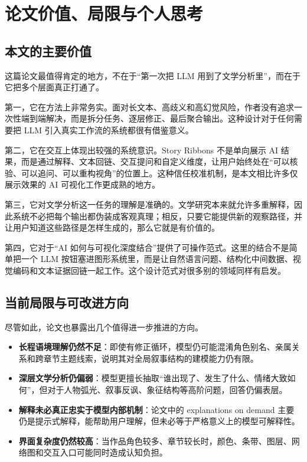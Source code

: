 \documentclass[a4paper,12pt,UTF8]{article}
\begin{document}
\section{论文价值、局限与个人思考}

\subsection{本文的主要价值}
这篇论文最值得肯定的地方，不在于“第一次把 LLM 用到了文学分析里”，而在于它把多个层面真正打通了。

第一，它在方法上非常务实。面对长文本、高歧义和高幻觉风险，作者没有追求一次性端到端解决，而是拆分任务、逐层修正、最后聚合输出。这种设计对于任何需要把 LLM 引入真实工作流的系统都很有借鉴意义。

第二，它在交互上体现出较强的系统意识。Story Ribbons 不是单向展示 AI 结果，而是通过解释、文本回链、交互提问和自定义维度，让用户始终处在“可以核验、可以追问、可以重构视角”的位置上。这种信任校准机制，是本文相比许多仅展示效果的 AI 可视化工作更成熟的地方。

第三，它对文学分析这一任务的理解是准确的。文学研究本来就允许多重解释，因此系统不必把每个输出都伪装成客观真理；相反，只要它能提供新的观察路径，并让用户知道这些路径是怎样生成的，那么它就是有价值的。

第四，它对于“AI 如何与可视化深度结合”提供了可操作范式。这里的结合不是简单把一个 LLM 按钮塞进图形系统里，而是让自然语言问题、结构化中间数据、视觉编码和文本证据回链一起工作。这个设计范式对很多别的领域同样有启发。

\subsection{当前局限与可改进方向}
尽管如此，论文也暴露出几个值得进一步推进的方向。

\begin{itemize}
    \item \textbf{长程语境理解仍然不足}：即使有修正循环，模型仍可能混淆角色别名、亲属关系和跨章节主题线索，说明其对全局叙事结构的建模能力仍有限。
    \item \textbf{深层文学分析仍偏弱}：模型更擅长抽取“谁出现了、发生了什么、情绪大致如何”，但对于人物弧光、叙事反讽、象征结构等高阶问题，回答仍偏表层。
    \item \textbf{解释未必真正忠实于模型内部机制}：论文中的 explanations on demand 主要仍是提示式解释，能帮助用户理解，但未必等于严格意义上的模型可解释性。
    \item \textbf{界面复杂度仍然较高}：当作品角色较多、章节较长时，颜色、条带、图层、网络图和交互入口可能同时造成认知负担。
\end{itemize}
\end{document}
